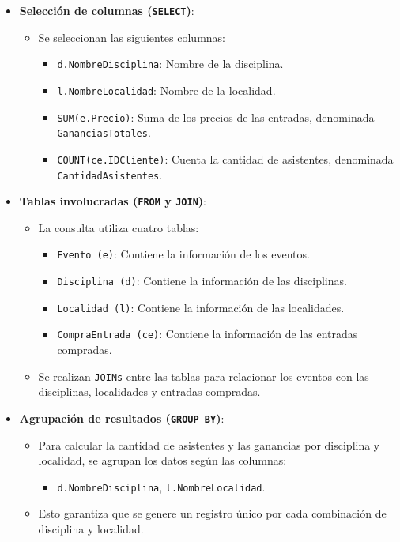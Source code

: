 \begin{itemize}
   \item \textbf{Selección de columnas (\texttt{SELECT})}:
   \begin{itemize}
       \item Se seleccionan las siguientes columnas:
       \begin{itemize}
           \item \texttt{d.NombreDisciplina}: Nombre de la disciplina.
           \item \texttt{l.NombreLocalidad}: Nombre de la localidad.
           \item \texttt{SUM(e.Precio)}: Suma de los precios de las entradas, denominada \texttt{GananciasTotales}.
           \item \texttt{COUNT(ce.IDCliente)}: Cuenta la cantidad de asistentes, denominada \texttt{CantidadAsistentes}.
       \end{itemize}
   \end{itemize}
   
   \item \textbf{Tablas involucradas (\texttt{FROM} y \texttt{JOIN})}:
   \begin{itemize}
       \item La consulta utiliza cuatro tablas:
       \begin{itemize}
           \item \texttt{Evento (e)}: Contiene la información de los eventos.
           \item \texttt{Disciplina (d)}: Contiene la información de las disciplinas.
           \item \texttt{Localidad (l)}: Contiene la información de las localidades.
           \item \texttt{CompraEntrada (ce)}: Contiene la información de las entradas compradas.
       \end{itemize}
       \item Se realizan \texttt{JOINs} entre las tablas para relacionar los eventos con las disciplinas, localidades y entradas compradas.
   \end{itemize}
   
   \item \textbf{Agrupación de resultados (\texttt{GROUP BY})}:
   \begin{itemize}
       \item Para calcular la cantidad de asistentes y las ganancias por disciplina y localidad, se agrupan los datos según las columnas:
       \begin{itemize}
           \item \texttt{d.NombreDisciplina}, \texttt{l.NombreLocalidad}.
       \end{itemize}
       \item Esto garantiza que se genere un registro único por cada combinación de disciplina y localidad.
   \end{itemize}
   

\end{itemize}
